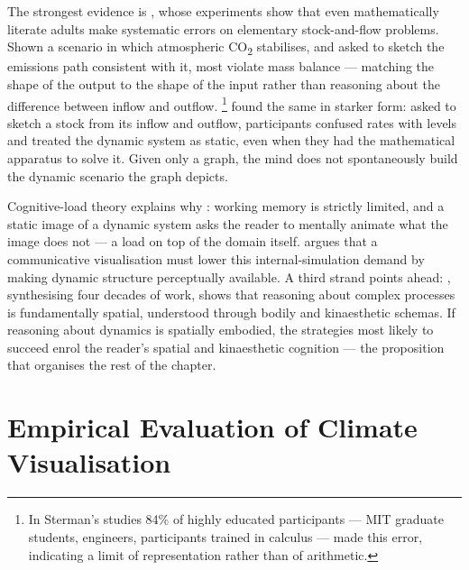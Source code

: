 The strongest evidence is \citet{sterman2008}, whose experiments show that even mathematically literate adults make systematic errors on elementary stock-and-flow problems. Shown a scenario in which atmospheric CO\textsubscript{2} stabilises, and asked to sketch the emissions path consistent with it, most violate mass balance --- matching the shape of the output to the shape of the input rather than reasoning about the difference between inflow and outflow.
\footnote{In Sterman's studies 84\% of highly educated participants --- MIT graduate students, engineers, participants trained in calculus --- made this error, indicating a limit of representation rather than of arithmetic.} \citet{cronin2009} found the same in starker form: asked to sketch a stock from its inflow and outflow, participants confused rates with levels and treated the dynamic system as static, even when they had the mathematical apparatus to solve it. Given only a graph, the mind does not spontaneously build the dynamic scenario the graph depicts.



Cognitive-load theory explains why \citep{sweller1988, swellervanmerrienboer2019}: working memory is strictly limited, and a static image of a dynamic system asks the reader to mentally animate what the image does not --- a load on top of the domain itself. \citet{ware2021} argues that a communicative visualisation must lower this internal-simulation demand by making dynamic structure perceptually available. A third strand points ahead: \citet{tversky2019}, synthesising four decades of work, shows that reasoning about complex processes is fundamentally spatial, understood through bodily and kinaesthetic schemas. If reasoning about dynamics is spatially embodied, the strategies most likely to succeed enrol the reader's spatial and kinaesthetic cognition --- the proposition that organises the rest of the chapter.

\section{Empirical Evaluation of Climate Visualisation}
\label{sec:empirical-viz}

